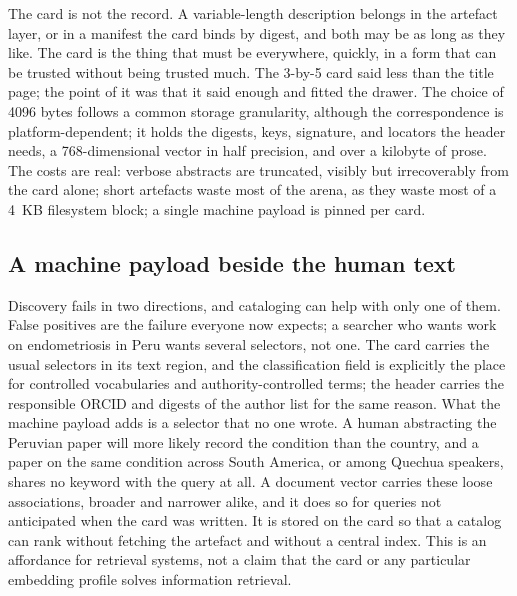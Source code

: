\documentclass[11pt]{article}
\begin{document}
The card is not the record. A variable-length description belongs in the
artefact layer, or in a manifest the card binds by digest, and both may be as
long as they like. The card is the thing that must be everywhere, quickly, in
a form that can be trusted without being trusted much. The 3-by-5 card said
less than the title page; the point of it was that it said enough and fitted
the drawer. The choice of 4096 bytes follows a common storage granularity,
although the correspondence is platform-dependent; it holds the digests,
keys, signature, and locators the header needs, a 768-dimensional vector in
half precision, and over a kilobyte of prose. The costs are real: verbose
abstracts are truncated, visibly but irrecoverably from the card alone; short
artefacts waste most of the arena, as they waste most of a 4~KB filesystem
block; a single machine payload is pinned per card.

\subsection{A machine payload beside the human text}

Discovery fails in two directions, and cataloging can help with only one of
them. False positives are the failure everyone now expects; a searcher who
wants work on endometriosis in Peru wants several selectors, not one. The card
carries the usual selectors in its text region, and the classification field
is explicitly the place for controlled vocabularies and authority-controlled
terms; the header carries the responsible ORCID and digests of the author list
for the same reason. What the machine payload adds is a selector that no one
wrote. A human abstracting the Peruvian paper will more likely record the
condition than the country, and a paper on the same condition across South
America, or among Quechua speakers, shares no keyword with the query at all. A
document vector carries these loose associations, broader and narrower alike,
and it does so for queries not anticipated when the card was written. It is
stored on the card so that a catalog can rank without fetching the artefact
and without a central index. This is an affordance for retrieval systems, not
a claim that the card or any particular embedding profile solves information
retrieval.
\end{document}
